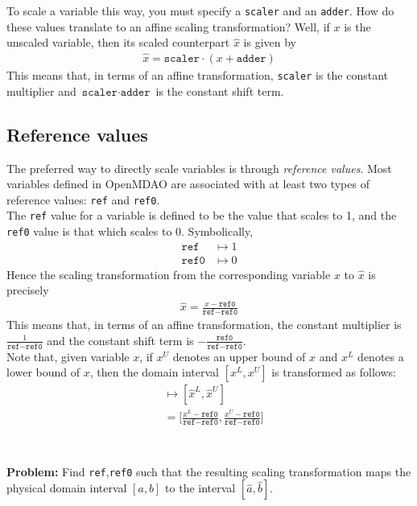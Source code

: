 \documentclass{article}
\begin{document}
To scale a variable this way, you must specify a \texttt{scaler} and an \texttt{adder}. How do these values translate to an affine scaling transformation? Well, if $x$ is the unscaled variable, then its scaled counterpart $\hat{x}$ is given by
\begin{align}
    \hat{x} = \texttt{scaler} \cdot (x + \texttt{adder}) \label{eq:scaler_adder_trans}
\end{align}
This means that, in terms of an affine transformation, \texttt{scaler} is the constant multiplier and $\texttt{scaler} \cdot \texttt{adder}$ is the constant shift term. \\

\subsection*{Reference values}

The preferred way to directly scale variables is through \textit{reference values}. Most variables defined in OpenMDAO are associated with at least two types of reference values: \texttt{ref} and \texttt{ref0}. \\

\noindent
The \texttt{ref} value for a variable is defined to be the value that scales to 1, and the \texttt{ref0} value is that which scales to 0. Symbolically,
\begin{align*}
    \texttt{ref} &\mapsto 1 \\
    \texttt{ref0} &\mapsto 0
\end{align*}
Hence the scaling transformation from the corresponding variable $x$ to $\hat{x}$ is precisely
\begin{align}
    \hat{x} = \frac{x - \texttt{ref0}}{\texttt{ref} - \texttt{ref0}} \label{eq:ref_scale}
\end{align}
This means that, in terms of an affine transformation, the constant multiplier is $\frac{1}{\texttt{ref} - \texttt{ref0}}$ and the constant shift term is $-\frac{\texttt{ref0}}{\texttt{ref} - \texttt{ref0}}$. \\

\noindent
Note that, given variable $x$, if $x^U$ denotes an upper bound of $x$ and $x^L$ denotes a lower bound of $x$, then the domain interval $[x^L,x^U]$ is transformed as follows:
\begin{align*}
    [x^L,x^U] &\mapsto [\hat{x}^L,\hat{x}^U] \\
    &= \Big[\frac{x^L-\texttt{ref0}}{\texttt{ref}-\texttt{ref0}},\frac{x^U-\texttt{ref0}}{\texttt{ref}-\texttt{ref0}}\Big] \\
\end{align*}
\\ \\
\noindent
\textbf{Problem:} Find \texttt{ref},\texttt{ref0} such that the resulting scaling transformation maps the physical domain interval $[a,b]$ to the interval $[\hat{a},\hat{b}]$. \\
\end{document}
